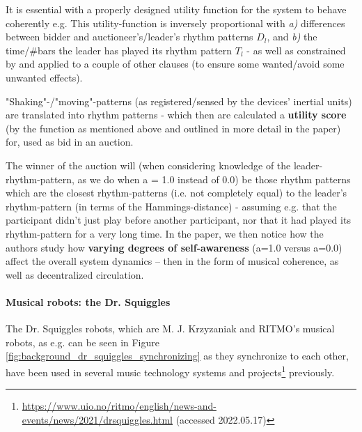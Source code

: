 			It is essential with a properly designed utility function for the system to behave coherently e.g. This utility-function is inversely proportional with \textit{a)} differences between bidder and auctioneer's/leader's rhythm patterns $D_l$, and \textit{b)} the time/\#bars the leader has played its rhythm pattern $T_l$ - as well as constrained by and applied to a couple of other clauses (to ensure some wanted/avoid some unwanted effects).

			"Shaking"-/"moving"-patterns (as registered/sensed by the devices' inertial units) are translated into rhythm patterns - which then are calculated a \textbf{utility score} (by the function as mentioned above and outlined in more detail in the paper) for, used as bid in an auction.

			The winner of the auction will (when considering knowledge of the leader-rhythm-pattern, as we do when a = 1.0 instead of 0.0) be those rhythm patterns which are the closest rhythm-patterns (i.e. not completely equal) to the leader's rhythm-pattern (in terms of the Hammings-distance) - assuming e.g. that the participant didn't just play before another participant, nor that it had played its rhythm-pattern for a very long time. In the paper, we then notice how the authors study how \textbf{varying degrees of self-awareness} (a=1.0 versus a=0.0) affect the overall system dynamics -- then in the form of musical coherence, as well as decentralized circulation.

			
			\paragraph{Musical robots: the Dr. Squiggles \nl}
			\label{dr_squiggles}
			
			The Dr. Squiggles robots, which are M. J. Krzyzaniak and RITMO's musical robots, as e.g. can be seen in Figure \ref{fig:background_dr_squiggles_synchronizing} as they synchronize to each other, have been used in several music technology systems and projects\footnote{\url{https://www.uio.no/ritmo/english/news-and-events/news/2021/drsquiggles.html} (accessed 2022.05.17)} previously.
			
